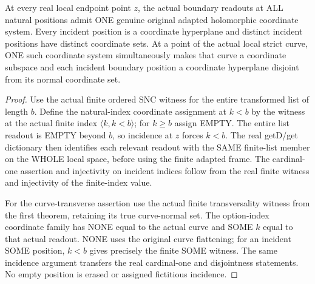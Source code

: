 \begin{theorem}
\label{hir:sharp-actual-local-zero-extended-boundary-coordinates}
\leanok
At every real local endpoint point $z$, the actual boundary readouts at
ALL natural positions admit ONE genuine original adapted holomorphic
coordinate system. Every incident position is a coordinate hyperplane
and distinct incident positions have distinct coordinate sets. At a
point of the actual local strict curve, ONE such coordinate system
simultaneously makes that curve a coordinate subspace and each incident
boundary position a coordinate hyperplane disjoint from its normal
coordinate set.
\end{theorem}
\begin{proof}
Use the actual finite ordered SNC witness for the entire transformed
list of length $b$. Define the natural-index coordinate assignment at
$k<b$ by the witness at the actual finite index $\langle k,k<b\rangle$;
for $k\geq b$ assign EMPTY. The entire list readout is EMPTY beyond $b$,
so incidence at $z$ forces $k<b$. The real getD/get dictionary then
identifies each relevant readout with the SAME finite-list member on
the WHOLE local space, before using the finite adapted frame.
The cardinal-one assertion and injectivity on incident indices follow
from the real finite witness and injectivity of the finite-index value.

For the curve-transverse assertion use the actual finite transversality
witness from the first theorem, retaining its true curve-normal set.
The option-index coordinate family has NONE equal to the actual curve
and SOME $k$ equal to that actual readout. NONE uses the original curve
flattening; for an incident SOME position, $k<b$ gives precisely the
finite SOME witness. The same incidence argument transfers the real
cardinal-one and disjointness statements. No empty position is erased
or assigned fictitious incidence.
\end{proof}

